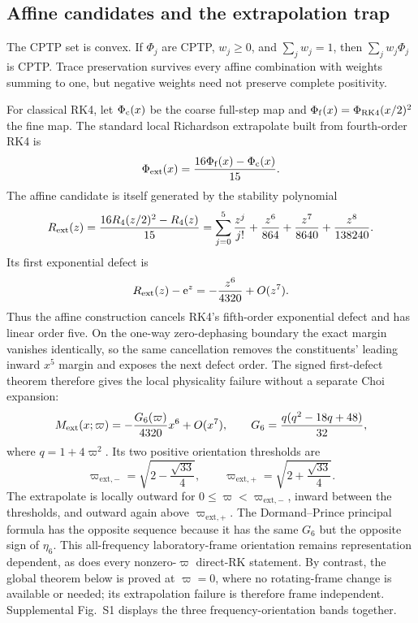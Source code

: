 \subsection{Affine candidates and the extrapolation trap}

The CPTP set is convex. If $\Phi_j$ are CPTP, $w_j\ge0$, and $\sum_jw_j=1$, then $\sum_jw_j\Phi_j$ is CPTP. Trace preservation survives every affine combination with weights summing to one, but negative weights need not preserve complete positivity.

For classical RK4, let $\Phi_{\rm c}(x)$ be the coarse full-step map and $\Phi_{\rm f}(x)=\Phi_{\rm RK4}(x/2)^2$ the fine map. The standard local Richardson extrapolate built from fourth-order RK4 is \cite{Szyszkowicz1985Richardson,ZlatevEtAl2017Richardson,HavasiKazemi2018Richardson}
\begin{equation}
 \Phi_{\rm ext}(x)=\frac{16\Phi_{\rm f}(x)-\Phi_{\rm c}(x)}{15}.
 \label{eq:richardson_map}
\end{equation}
The affine candidate is itself generated by the stability polynomial
\begin{equation}
 R_{\rm ext}(z)=\frac{16R_4(z/2)^2-R_4(z)}{15}
 =\sum_{j=0}^{5}\frac{z^j}{j!}+\frac{z^6}{864}+\frac{z^7}{8640}+\frac{z^8}{138240}.
 \label{eq:richardson_stability}
\end{equation}
Its first exponential defect is
\begin{equation}
 R_{\rm ext}(z)-\mathrm{e}^z=-\frac{z^6}{4320}+O(z^7).
 \label{eq:richardson_defect}
\end{equation}
Thus the affine construction cancels RK4's fifth-order exponential defect and has linear order five. On the one-way zero-dephasing boundary the exact margin vanishes identically, so the same cancellation removes the constituents' leading inward $x^5$ margin and exposes the next defect order. The signed first-defect theorem therefore gives the local physicality failure without a separate Choi expansion:
\begin{equation}
 M_{\rm ext}(x;\varpi)
 =-\frac{G_6(\varpi)}{4320}x^6+O(x^7),
 \qquad
 G_6=\frac{q(q^2-18q+48)}{32},
 \label{eq:richardson_frequency}
\end{equation}
where $q=1+4\varpi^2$. Its two positive orientation thresholds are
\begin{equation}
 \varpi_{\mathrm{ext},-}=\sqrt{2-\frac{\sqrt{33}}4},
 \qquad
 \varpi_{\mathrm{ext},+}=\sqrt{2+\frac{\sqrt{33}}4}.
 \label{eq:richardson_frequency_thresholds}
\end{equation}
The extrapolate is locally outward for $0\le\varpi<\varpi_{\mathrm{ext},-}$, inward between the thresholds, and outward again above $\varpi_{\mathrm{ext},+}$. The Dormand--Prince principal formula has the opposite sequence because it has the same $G_6$ but the opposite sign of $\eta_6$. This all-frequency laboratory-frame orientation remains representation dependent, as does every nonzero-$\varpi$ direct-RK statement. By contrast, the global theorem below is proved at $\varpi=0$, where no rotating-frame change is available or needed; its extrapolation failure is therefore frame independent. Supplemental Fig.~S1 displays the three frequency-orientation bands together.

